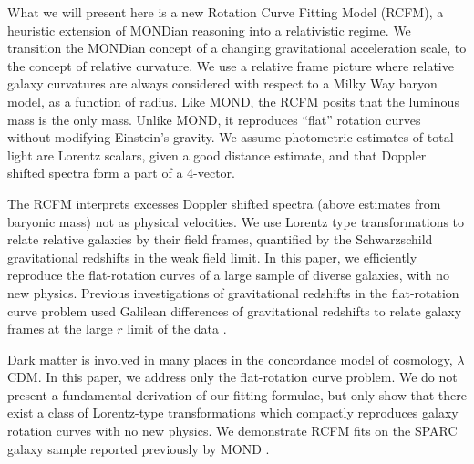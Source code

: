 \documentclass[reprint,%
 amsmath,amssymb,
 aps,
]{revtex4-1}
\begin{document}
What we will present here is  a new Rotation Curve Fitting Model (RCFM),  a heuristic  extension of  MONDian reasoning into a relativistic regime. We   transition the MONDian concept of  a changing gravitational acceleration scale,   to  the concept of relative curvature.  We use a  relative frame picture  where relative galaxy curvatures  are always considered with respect to a Milky Way baryon model, as a function of radius. 
Like MOND, the RCFM posits that the luminous mass is the only mass. Unlike MOND, it reproduces ``flat'' rotation curves
 without modifying Einstein's gravity. 
   We assume   photometric estimates of total light are Lorentz scalars, given a good distance estimate, and that Doppler shifted spectra form a part of a 4-vector. 
 
 
 The RCFM interprets excesses Doppler shifted spectra  (above estimates from baryonic mass) not as physical velocities.  We use Lorentz type transformations to relate relative galaxies by their field frames, quantified by the Schwarzschild gravitational redshifts in the weak field limit.  In this paper,    we  efficiently reproduce  the flat-rotation curves of a large sample of diverse galaxies,  with no new physics.
 Previous investigations of gravitational redshifts in the flat-rotation curve problem   used  Galilean differences of gravitational redshifts to relate galaxy frames at the large $r$ limit of the data \cite{MTW}.
 
 
  
 Dark matter is   involved in many places in the concordance model of cosmology,     $\lambda$CDM. In  this paper, we   address only the flat-rotation curve problem.      We do not present a fundamental derivation of our fitting formulae, but only  show  that there exist a  class of  Lorentz-type transformations  which compactly  reproduces galaxy rotation curves   with no   new physics.    We demonstrate RCFM  fits on the SPARC\cite{2016Lelli} galaxy sample   reported previously by     MOND \cite{McGaugh2016RAR}. 
   
 
 
  
  
  
  
\end{document}
